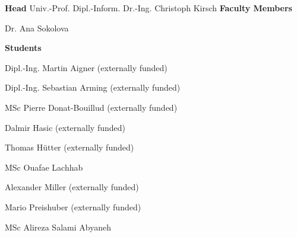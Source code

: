 \textcolor{\workinggroupboxtextcolor}{
	\textbf{Head}
	\newline
    \newline
	Univ.-Prof. Dipl.-Inform. Dr.-Ing. Christoph Kirsch
	\newline
    \newline
	\textbf{Faculty Members}
	\begin{compactitem}
	  \item Dr. Ana Sokolova
	\end{compactitem}
	\vspace{0.5cm}
	\textbf{Students}
	\begin{compactitem}
	  \item Dipl.-Ing. Martin Aigner (externally funded)
	  \item Dipl.-Ing. Sebastian Arming (externally funded)
	  \item MSc Pierre Donat-Bouillud (externally funded)
	  \item Dalmir Hasic (externally funded)
	  \item Thomas Hütter (externally funded)
	  \item MSc Ouafae Lachhab
	  \item Alexander Miller (externally funded)
	  \item Mario Preishuber (externally funded)
	  \item MSc Alireza Salami Abyaneh
	\end{compactitem}
} 